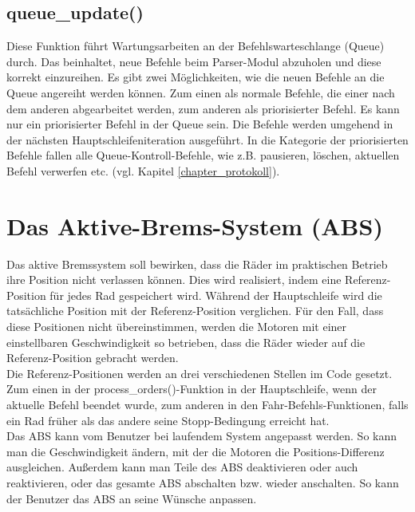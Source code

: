 \subsection{queue\_update()\label{chapter_queue_update}}
Diese Funktion führt Wartungsarbeiten an der Befehlswarteschlange (Queue) durch. Das beinhaltet, neue
Befehle beim Parser-Modul abzuholen und diese korrekt einzureihen. Es gibt zwei Möglichkeiten, wie die
neuen Befehle an die Queue angereiht werden können. Zum einen als normale Befehle, die einer nach dem anderen abgearbeitet werden,
zum anderen als priorisierter Befehl. Es kann nur ein priorisierter Befehl in der Queue sein. Die Befehle werden
umgehend in der nächsten Haupt\-schleifen\-iteration ausgeführt. In die Kategorie der priorisierten Befehle fallen
alle Queue-Kontroll-Befehle, wie z.B. pausieren, löschen, aktuellen Befehl verwerfen etc. (vgl. Kapitel \ref{chapter_protokoll}).

\section{Das Aktive-Brems-System (ABS)\label{chapter_abs}}
Das aktive Bremssystem soll bewirken, dass die Räder im praktischen Betrieb ihre Position nicht verlassen können.
Dies wird realisiert, indem
eine Referenz-Position für jedes Rad gespeichert wird. Während der Hauptschleife wird die tatsächliche Position mit
der Referenz-Position verglichen. Für den Fall, dass diese Positionen nicht übereinstimmen, werden die Motoren mit einer
einstellbaren Geschwindigkeit so betrieben, dass die Räder wieder auf die Referenz-Position gebracht werden.\\
Die Referenz-Positionen werden an drei verschiedenen Stellen im Code gesetzt. Zum einen in der process\_\-orders()-Funktion
in der Hauptschleife, wenn der aktuelle Befehl beendet wurde, zum anderen in den Fahr-Befehls-Funktionen, falls ein Rad
früher als das andere seine Stopp-Bedingung erreicht hat.\\
Das ABS kann vom Benutzer bei laufendem System angepasst werden. So kann man die Geschwindigkeit ändern, mit der
die Motoren die Positions-Differenz ausgleichen. Außerdem kann man Teile des ABS deaktivieren oder auch reaktivieren,
oder das gesamte ABS abschalten bzw. wieder anschalten. So kann der Benutzer das ABS an seine Wünsche anpassen.

